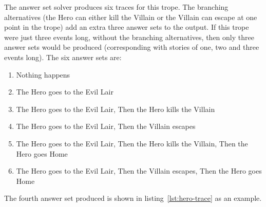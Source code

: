 \documentclass[11pt]{report}
\begin{document}
The answer set solver produces six traces for this trope. The branching
alternatives (the Hero can either kill the Villain or the Villain can escape at
one point in the trope) add an extra three answer sets to the output. If this
trope were just three events long, without the branching alternatives, then only
three answer sets would be produced (corresponding with stories of one, two
and three events long). The six answer sets are:

\begin{enumerate}
  \item Nothing happens
  \item The Hero goes to the Evil Lair
  \item The Hero goes to the Evil Lair, Then the Hero kills the Villain
  \item The Hero goes to the Evil Lair, Then the Villain escapes
  \item The Hero goes to the Evil Lair, Then the Hero kills the Villain, Then
    the Hero goes Home
  \item The Hero goes to the Evil Lair, Then the Villain escapes, Then the Hero
    goes Home
\end{enumerate}

The fourth answer set produced is shown in
listing~\ref{lst:hero-trace} as an example.
\end{document}
